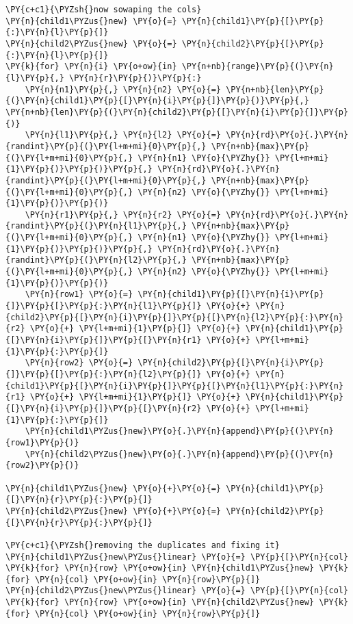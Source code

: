 \begin{tcolorbox}[breakable, size=fbox, boxrule=1pt, pad at break*=1mm,colback=cellbackground, colframe=cellborder]
\begin{Verbatim}[commandchars=\\\{\}]
\PY{c+c1}{\PYZsh{}now sowaping the cols}
\PY{n}{child1\PYZus{}new} \PY{o}{=} \PY{n}{child1}\PY{p}{[}\PY{p}{:}\PY{n}{l}\PY{p}{]}
\PY{n}{child2\PYZus{}new} \PY{o}{=} \PY{n}{child2}\PY{p}{[}\PY{p}{:}\PY{n}{l}\PY{p}{]}
\PY{k}{for} \PY{n}{i} \PY{o+ow}{in} \PY{n+nb}{range}\PY{p}{(}\PY{n}{l}\PY{p}{,} \PY{n}{r}\PY{p}{)}\PY{p}{:}
    \PY{n}{n1}\PY{p}{,} \PY{n}{n2} \PY{o}{=} \PY{n+nb}{len}\PY{p}{(}\PY{n}{child1}\PY{p}{[}\PY{n}{i}\PY{p}{]}\PY{p}{)}\PY{p}{,} \PY{n+nb}{len}\PY{p}{(}\PY{n}{child2}\PY{p}{[}\PY{n}{i}\PY{p}{]}\PY{p}{)}
    \PY{n}{l1}\PY{p}{,} \PY{n}{l2} \PY{o}{=} \PY{n}{rd}\PY{o}{.}\PY{n}{randint}\PY{p}{(}\PY{l+m+mi}{0}\PY{p}{,} \PY{n+nb}{max}\PY{p}{(}\PY{l+m+mi}{0}\PY{p}{,} \PY{n}{n1} \PY{o}{\PYZhy{}} \PY{l+m+mi}{1}\PY{p}{)}\PY{p}{)}\PY{p}{,} \PY{n}{rd}\PY{o}{.}\PY{n}{randint}\PY{p}{(}\PY{l+m+mi}{0}\PY{p}{,} \PY{n+nb}{max}\PY{p}{(}\PY{l+m+mi}{0}\PY{p}{,} \PY{n}{n2} \PY{o}{\PYZhy{}} \PY{l+m+mi}{1}\PY{p}{)}\PY{p}{)}
    \PY{n}{r1}\PY{p}{,} \PY{n}{r2} \PY{o}{=} \PY{n}{rd}\PY{o}{.}\PY{n}{randint}\PY{p}{(}\PY{n}{l1}\PY{p}{,} \PY{n+nb}{max}\PY{p}{(}\PY{l+m+mi}{0}\PY{p}{,} \PY{n}{n1} \PY{o}{\PYZhy{}} \PY{l+m+mi}{1}\PY{p}{)}\PY{p}{)}\PY{p}{,} \PY{n}{rd}\PY{o}{.}\PY{n}{randint}\PY{p}{(}\PY{n}{l2}\PY{p}{,} \PY{n+nb}{max}\PY{p}{(}\PY{l+m+mi}{0}\PY{p}{,} \PY{n}{n2} \PY{o}{\PYZhy{}} \PY{l+m+mi}{1}\PY{p}{)}\PY{p}{)}
    \PY{n}{row1} \PY{o}{=} \PY{n}{child1}\PY{p}{[}\PY{n}{i}\PY{p}{]}\PY{p}{[}\PY{p}{:}\PY{n}{l1}\PY{p}{]} \PY{o}{+} \PY{n}{child2}\PY{p}{[}\PY{n}{i}\PY{p}{]}\PY{p}{[}\PY{n}{l2}\PY{p}{:}\PY{n}{r2} \PY{o}{+} \PY{l+m+mi}{1}\PY{p}{]} \PY{o}{+} \PY{n}{child1}\PY{p}{[}\PY{n}{i}\PY{p}{]}\PY{p}{[}\PY{n}{r1} \PY{o}{+} \PY{l+m+mi}{1}\PY{p}{:}\PY{p}{]}
    \PY{n}{row2} \PY{o}{=} \PY{n}{child2}\PY{p}{[}\PY{n}{i}\PY{p}{]}\PY{p}{[}\PY{p}{:}\PY{n}{l2}\PY{p}{]} \PY{o}{+} \PY{n}{child1}\PY{p}{[}\PY{n}{i}\PY{p}{]}\PY{p}{[}\PY{n}{l1}\PY{p}{:}\PY{n}{r1} \PY{o}{+} \PY{l+m+mi}{1}\PY{p}{]} \PY{o}{+} \PY{n}{child1}\PY{p}{[}\PY{n}{i}\PY{p}{]}\PY{p}{[}\PY{n}{r2} \PY{o}{+} \PY{l+m+mi}{1}\PY{p}{:}\PY{p}{]}
    \PY{n}{child1\PYZus{}new}\PY{o}{.}\PY{n}{append}\PY{p}{(}\PY{n}{row1}\PY{p}{)}
    \PY{n}{child2\PYZus{}new}\PY{o}{.}\PY{n}{append}\PY{p}{(}\PY{n}{row2}\PY{p}{)}

\PY{n}{child1\PYZus{}new} \PY{o}{+}\PY{o}{=} \PY{n}{child1}\PY{p}{[}\PY{n}{r}\PY{p}{:}\PY{p}{]}
\PY{n}{child2\PYZus{}new} \PY{o}{+}\PY{o}{=} \PY{n}{child2}\PY{p}{[}\PY{n}{r}\PY{p}{:}\PY{p}{]}

\PY{c+c1}{\PYZsh{}removing the duplicates and fixing it}
\PY{n}{child1\PYZus{}new\PYZus{}linear} \PY{o}{=} \PY{p}{[}\PY{n}{col} \PY{k}{for} \PY{n}{row} \PY{o+ow}{in} \PY{n}{child1\PYZus{}new} \PY{k}{for} \PY{n}{col} \PY{o+ow}{in} \PY{n}{row}\PY{p}{]}
\PY{n}{child2\PYZus{}new\PYZus{}linear} \PY{o}{=} \PY{p}{[}\PY{n}{col} \PY{k}{for} \PY{n}{row} \PY{o+ow}{in} \PY{n}{child2\PYZus{}new} \PY{k}{for} \PY{n}{col} \PY{o+ow}{in} \PY{n}{row}\PY{p}{]}


\end{Verbatim}
\end{tcolorbox}
